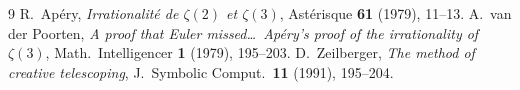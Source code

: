 \documentclass[11pt]{article}
\theoremstyle{remark}
\begin{document}
\begin{thebibliography}{9}
 R.~Ap\'ery, \emph{Irrationalit\'e de $\zeta(2)$ et
$\zeta(3)$}, Ast\'erisque \textbf{61} (1979), 11--13.
 A.~van der Poorten, \emph{A proof that Euler missed\ldots\
Ap\'ery's proof of the irrationality of $\zeta(3)$}, Math.\ Intelligencer
\textbf{1} (1979), 195--203.
 D.~Zeilberger, \emph{The method of creative
telescoping}, J.~Symbolic Comput.\ \textbf{11} (1991), 195--204.
\end{thebibliography}
\end{document}
